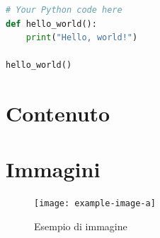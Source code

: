 \documentclass{article}
\begin{document}
\begin{lstlisting}[language=Python, caption={Your Python Code}, label=yourlabel]
# Your Python code here
def hello_world():
    print("Hello, world!")

hello_world()
\end{lstlisting}







\section{Contenuto}
\lipsum[2-3]

\section{Immagini}
\lipsum[4]

\begin{figure}[H]
  \centering
  \texttt{[image: example-image-a]}
  \caption{Esempio di immagine}
  \label{fig:example}
\end{figure}

\lipsum[5]


\printbibliography
\end{document}
